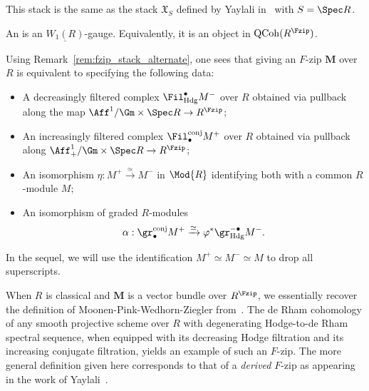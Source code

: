 \documentclass[10pt]{amsart}
\begin{document}
\begin{remark}
This stack is the same as the stack $\mathfrak{X}_S$ defined by Yaylali in~\cite[Appendix]{epiga:10375} with $S = \Spec R$.
\end{remark}   

\begin{definition}
An  is an $\underline{W_1(R)}$-gauge. Equivalently, it is an object in $\mathrm{QCoh}(R^{\Fzip})$.
\end{definition}

\begin{remark}
\label{rem:fzip_explicit_desc}
Using Remark~\ref{rem:fzip_stack_alternate}, one sees that giving an $F$-zip $\bm{M}$ over $R$ is equivalent to specifying the following data:
\begin{itemize}
   \item A decreasingly filtered complex $\Fil^\bullet_{\mathrm{Hdg}}M^-$ over $R$ obtained via pullback along the map $\Aff^1/\Gm\times\Spec R \to R^{\Fzip}$;
   \item An increasingly filtered complex $\Fil_\bullet^{\mathrm{conj}}M^+$ over $R$ obtained via pullback along $\Aff^1_+/\Gm\times\Spec R \to R^{\Fzip}$;
   \item An isomorphism $\eta:M^+\xrightarrow{\simeq} M^-$ in $\Mod{R}$ identifying both with a common $R$-module $M$;
   \item An isomorphism of graded $R$-modules
   \[
     \alpha:\gr_\bullet^{\mathrm{conj}}M^+\xrightarrow{\simeq}\varphi^*\gr^{-\bullet}_{\mathrm{Hdg}}M^-.
   \]
\end{itemize}
In the sequel, we will use the identification $M^+\simeq M^-\simeq M$ to drop all superscripts.
\end{remark}




\begin{remark}
When $R$ is classical and $\bm{M}$ is a vector bundle over $R^{\Fzip}$, we essentially recover the definition of Moonen-Pink-Wedhorn-Ziegler from~\cite{Pink2015-ye}. The de Rham cohomology of any smooth projective scheme over $R$ with degenerating Hodge-to-de Rham spectral sequence, when equipped with its decreasing Hodge filtration and its increasing conjugate filtration, yields an example of such an $F$-zip. The more general definition given here corresponds to that of a \emph{derived} $F$-zip as appearing in the work of Yaylali~\cite[\S 3.6]{epiga:10375}.
\end{remark}
\end{document}
